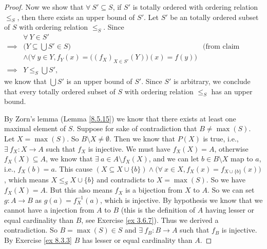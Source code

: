 \begin{proof}
    Now we show that \(\forall\ S' \subseteq S\), if \(S'\) is totally ordered with ordering relation \(\leq_S\), then there exists an upper bound of \(S'\).
    Let \(S'\) be an totally ordered subset of \(S\) with ordering relation \(\leq_S\).
    Since
    \begin{align*}
                 & \forall\ Y \in S'                                                                                              \\
        \implies & \Big(Y \subseteq \bigcup S' \in S\Big)                                             & \text{(from claim above)} \\
                 & \land \Big(\forall\ y \in Y, f_Y(x) = \big((f_X)_{X \in S'}(Y)\big)(x) = f(y)\Big)                             \\
        \implies & Y \leq_S \bigcup S',
    \end{align*}
    we know that \(\bigcup S'\) is an upper bound of \(S'\).
    Since \(S'\) is arbitrary, we conclude that every totally ordered subset of \(S\) with ordering relation \(\leq_S\) has an upper bound.

    By Zorn's lemma (Lemma \ref{8.5.15}) we know that there exists at least one maximal element of \(S\).
    Suppose for sake of contradiction that \(B \neq \max(S)\).
    Let \(X = \max(S)\).
    So \(B \setminus X \neq \emptyset\).
    Then we know that \(P(X)\) is true, i.e., \(\exists\ f_X : X \to A\) such that \(f_X\) is injective.
    We must have \(f_X(X) = A\), otherwise \(f_X(X) \subseteq A\), we know that \(\exists\ a \in A \setminus f_X(X)\), and we can let \(b \in B \setminus X\) map to \(a\), i.e., \(f_X(b) = a\).
    This cause \((X \subseteq X \cup \{b\}) \land \big(\forall\ x \in X, f_X(x) = f_{X \cup \{b\}}(x)\big)\), which means \(X \leq_S X \cup \{b\}\) and contradicts to \(X = \max(S)\).
    So we have \(f_X(X) = A\).
    But this also means \(f_X\) is a bijection from \(X\) to \(A\).
    So we can set \(g : A \to B\) as \(g(a) = f_X^{-1}(a)\), which is injective.
    By hypothesis we know that we cannot have a injection from \(A\) to \(B\) (this is the definition of \(A\) having lesser or equal cardinality than \(B\), see Exercise \ref{ex 3.6.7}).
    Thus we derived a contradiction.
    So \(B = \max(S) \in S\) and \(\exists\ f_B : B \to A\) such that \(f_B\) is injective.
    By Exercise \ref{ex 8.3.3} \(B\) has lesser or equal cardinality than \(A\).
\end{proof}

